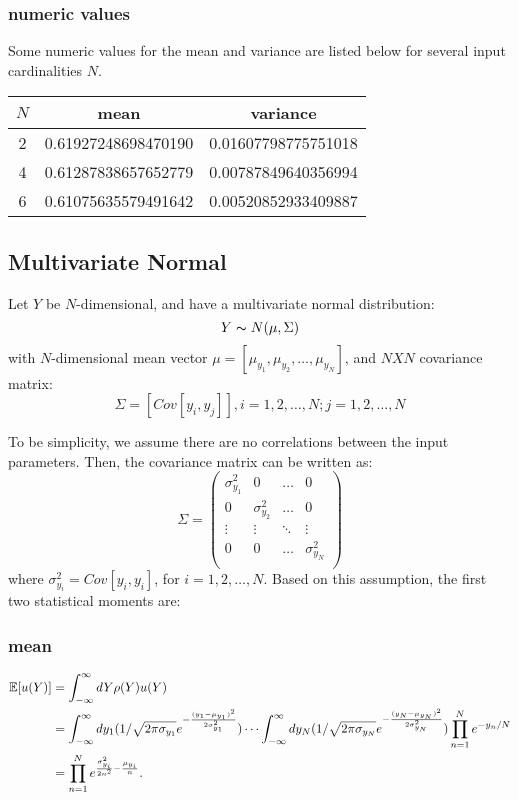 \subsubsection{numeric values}
Some numeric values for the mean and variance are listed below for several input cardinalities $N$.
\begin{table}[h!]
\centering
\begin{tabular}{c|c|c}
$N$ & mean & variance \\ \hline
2 & 0.61927248698470190 & 0.01607798775751018 \\
4 & 0.61287838657652779 & 0.00787849640356994 \\
6 & 0.61075635579491642 & 0.00520852933409887
\end{tabular}
\end{table}

\subsection{Multivariate Normal}
Let $Y$ be $N$-dimensional, and have a multivariate normal distribution:
\begin{equation}
Y \thicksim N(\mu,\Sigma)
\end{equation}
with $N$-dimensional mean vector $\mu=[\mu_{y_1},\mu_{y_2},\ldots,\mu_{y_N}]$, and $N X N$ covariance matrix:
\begin{equation}
\Sigma = [Cov[y_i,y_j]],i = 1,2,\ldots,N; j = 1,2,\ldots,N
\end{equation}

To be simplicity, we assume there are no correlations between the input parameters. Then, the covariance matrix can be written
as:
\begin{equation}
\Sigma =
\begin{pmatrix}
\sigma_{y_1}^2 & 0 &\ldots & 0 \\
0 & \sigma_{y_2}^2 &\ldots & 0 \\
\vdots &\vdots &\ddots & \vdots \\
0 & 0 & \ldots & \sigma_{y_N}^2\\
\end{pmatrix}
\end{equation}
where $\sigma_{y_i}^2 = Cov[y_i,y_i]$, for $i = 1,2,\ldots,N$. Based on this assumption, the first two statistical moments are:
\subsubsection{mean}
\begin{align}
\mathbb{E}[ u(Y)] &=\int_{-\infty}^\infty dY \rho(Y)u(Y) \notag \\
  &=\int_{-\infty}^\infty dy_1 (1/\sqrt{2 \pi \sigma_{y_1}}e^{-\frac{(y_1-\mu_{y_1})^2}{2\sigma_{y_1}^2}})\cdots\int_{-\infty}^\infty dy_N  (1/\sqrt{2 \pi \sigma_{y_N}}e^{-\frac{(y_N-\mu_{y_N})^2}{2\sigma_{y_N}^2}})\prod_{n=1}^N e^{-y_n/N} \\
  &=\prod_{n=1}^N e^{\frac{\sigma_{y_i}^2}{2n^2}-\frac{\mu_{y_i}}{n}}. \notag
\end{align}

